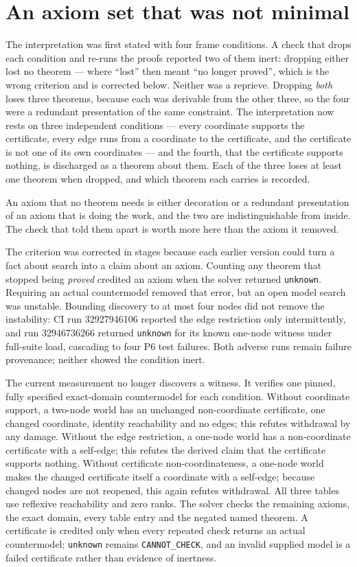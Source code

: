 \section{An axiom set that was not minimal}

The interpretation was first stated with four frame conditions. A check that
drops each condition and re-runs the proofs reported two of them inert: dropping
either lost no theorem --- where ``lost'' then meant ``no longer proved'', which is
the wrong criterion and is corrected below. Neither was a reprieve. Dropping \emph{both} loses three
theorems, because each was derivable from the other three, so the four were a
redundant presentation of the same constraint. The interpretation now rests on
three independent conditions --- every coordinate supports the certificate, every
edge runs from a coordinate to the certificate, and the certificate is not one
of its own coordinates --- and the fourth, that the certificate supports nothing,
is discharged as a theorem about them. Each of the three loses at least one
theorem when dropped, and which theorem each carries is recorded.

An axiom that no theorem needs is either decoration or a redundant presentation
of an axiom that is doing the work, and the two are indistinguishable from
inside. The check that told them apart is worth more here than the axiom it
removed.

The criterion was corrected in stages because each earlier version could turn a
fact about search into a claim about an axiom. Counting any theorem that stopped
being \emph{proved} credited an axiom when the solver returned \texttt{unknown}.
Requiring an actual countermodel removed that error, but an open model search
was unstable. Bounding discovery to at most four nodes did not remove the
instability: CI run 32927946106 reported the edge restriction only
intermittently, and run 32946736266 returned \texttt{unknown} for its known
one-node witness under full-suite load, cascading to four P6 test failures. Both
adverse runs remain failure provenance; neither showed the condition inert.

The current measurement no longer discovers a witness. It verifies one pinned,
fully specified exact-domain countermodel for each condition. Without coordinate
support, a two-node world has an unchanged non-coordinate certificate, one
changed coordinate, identity reachability and no edges; this refutes withdrawal
by any damage. Without the edge restriction, a one-node world has a
non-coordinate certificate with a self-edge; this refutes the derived claim that
the certificate supports nothing. Without certificate non-coordinateness, a
one-node world makes the changed certificate itself a coordinate with a
self-edge; because changed nodes are not reopened, this again refutes withdrawal.
All three tables use reflexive reachability and zero ranks. The solver checks the
remaining axioms, the exact domain, every table entry and the negated named
theorem. A certificate is credited only when every repeated check returns an
actual countermodel; \texttt{unknown} remains \texttt{CANNOT\_CHECK}, and an
invalid supplied model is a failed certificate rather than evidence of
inertness.

